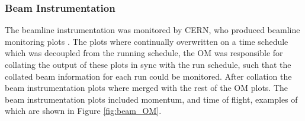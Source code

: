 \subsubsection*{Beam Instrumentation}
The beamline instrumentation was monitored by CERN, who produced beamline
monitoring plots \cite{Booth:2019brj}. The plots where continually overwritten 
on a time schedule which was decoupled from the \protodune{} running schedule, 
the OM was responsible for collating the output of these plots in sync with 
the \protodune{} run schedule, such that the collated beam information for 
each run could be monitored. After collation the beam instrumentation plots 
where merged with the rest of the OM plots. The beam instrumentation plots 
included momentum, and time of flight, examples of which are shown in 
Figure \ref{fig:beam_OM}.

